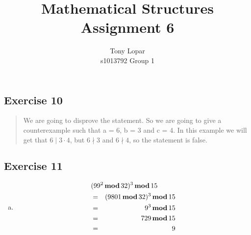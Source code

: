 \documentclass[a4paper]{article}
\title{Mathematical Structures\\Assignment 6}
\author{Tony Lopar \\ s1013792 \quad Group 1}
\newcommand{\exercise}[2]{\subsection*{Exercise #1}{#2}}
\newcommand{\exerciseenum}[2]{\subsection*{Exercise #1}{\begin{enumerate}[a)]#2\end{enumerate}}}
\DeclareMathOperator{\divides}{\mid}
\DeclareMathOperator{\emod}{\mathbf{mod}}
\begin{document}
\maketitle


\exercise{10}{%
\begin{quote}
We are going to disprove the statement.
So we are going to give a counterexample such that a = 6, b = 3 and c = 4. In this example we will get that $6 \mid 3 \cdot 4$, but $6 \nmid 3$ and $6 \nmid 4$, so the statement is false.
\end{quote}
}
\exerciseenum{11}{%
\item%
\begin{eqnarray*}
\lefteqn{(99^2 \emod 32)^3 \emod 15 } \\ %
&=& (9801 \emod 32)^3 \emod 15  \\
&=& 9^3 \emod 15 \\
&=& 729 \emod 15 \\
&=& 9
\end{eqnarray*}
}
\end{document}
